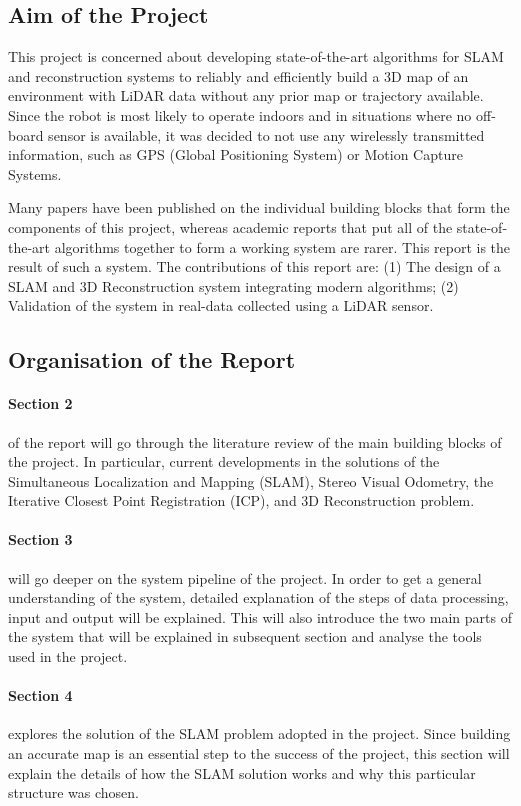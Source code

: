 \documentclass[11pt]{article}
\begin{document}
	\subsection{Aim of the Project}

This project is concerned about developing state-of-the-art algorithms for SLAM and reconstruction systems to reliably and efficiently build a 3D map of an environment with LiDAR data without any prior map or trajectory available. Since the robot is most likely to operate indoors and in situations where no off-board sensor is available, it was decided to not use any wirelessly transmitted information, such as GPS (Global Positioning System) or Motion Capture Systems.
	
Many papers have been published on the individual building blocks that form the components of this project, whereas academic reports that put all of the state-of-the-art algorithms together to form a working system are rarer. This report is the result of such a system. The contributions of this report are: (1) The design of a SLAM and 3D Reconstruction system integrating modern algorithms; (2) Validation of the system in real-data collected using a LiDAR sensor.
	
	\subsection{ Organisation of the Report}

\paragraph{Section 2} of the report will go through the literature review of the main building blocks of the project. In particular, current developments in the solutions of the Simultaneous Localization and Mapping (SLAM), Stereo Visual Odometry, the Iterative Closest Point Registration (ICP), and 3D Reconstruction problem.
	
\paragraph{Section 3} will go deeper on the system pipeline of the project. In order to get a general understanding of the system, detailed explanation of the steps of data processing, input and output will be explained. This will also introduce the two main parts of the system that will be explained in subsequent section and analyse the tools used in the project.
		
\paragraph{Section 4} explores the solution of the SLAM problem adopted in the project. Since building an accurate map is an essential step to the success of the project, this section will explain the details of how the SLAM solution works and why this particular structure was chosen.
		
\end{document}
